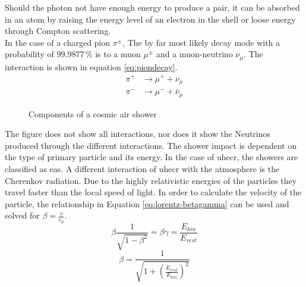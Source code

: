 \documentclass[abstract,toc,los,lof,english,10pt,glossary,acronyms]{jluthesis}
\begin{document}
Should the photon not have enough energy to produce a pair, it can be absorbed in an atom by raising the energy level of an electron in the shell or loose energy through Compton scattering.\\
In the case of a charged pion $\pi^\pm$, The by far most likely decay mode with a probability of $99.9877\,\%$ is to a muon $\mu^\pm$ and a muon-neutrino $\nu_\mu$.\cite[1211]{10.1093/ptep/ptaa104} The interaction is shown in equation \ref{eq:piondecay}.
\begin{equation}\label{eq:piondecay}
	\begin{aligned}
		\pi^+ &\rightarrow \mu^+ + \nu_\mu \\
		\pi^- &\rightarrow \mu^- + \bar{\nu}_\mu
	\end{aligned}
\end{equation}
\begin{figure}[ht!]
	\centering
	\caption{Components of a cosmic air shower}
	\label{fig:shower-components}
\end{figure}
The figure does not show all interactions, nor does it show the Neutrinos produced through the different interactions.
The shower impact is dependent on the type of primary particle and its energy. In the case of \acrshort{uhecr}, the showers are classified as \acrfull{eas}.
\clearpage
A different interaction of \acrshort{uhecr} with the atmosphere is the Cherenkov radiation. Due to the highly relativistic energies of the particles they travel faster than the local speed of light. In order to calculate the velocity of the particle, the relationship in Equation \ref{eq:lorentz-betagamma} can be used and solved for $\beta=\frac{v}{c_0}$.
\begin{equation} \label{eq:lorentz-betagamma}
	\beta\frac{1}{\sqrt{1 - \beta^2}} = \beta\gamma = \frac{E_{kin}}{E_{rest}}
\end{equation}
\begin{equation}
	\beta=\frac{1}{\sqrt{1 + \left(\frac{E_{rest}}{E_{kin}}\right)^2}}
\end{equation}
\end{document}
